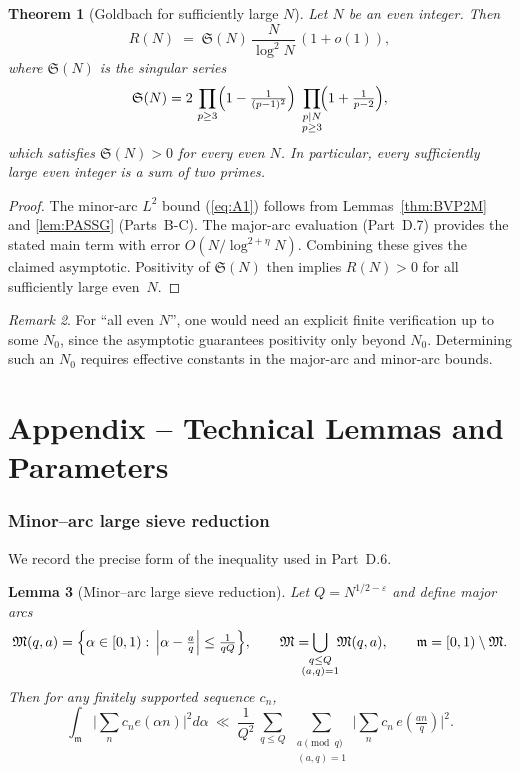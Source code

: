 \documentclass[11pt]{article}
\def\eqref#1{(\ref{#1})}%
\newtheorem{lemma}{Lemma}[part]
\newtheorem{theorem}[lemma]{Theorem}
\theoremstyle{definition}
\theoremstyle{remark}
\newtheorem{remark}[lemma]{Remark}
\numberwithin{equation}{part}
\begin{document}
\begin{theorem}[Goldbach for sufficiently large $N$]\label{thm:goldbach}
	Let $N$ be an even integer. Then
	\[
		R(N)\;=\;\mathfrak S(N)\,\frac{N}{\log^2 N}\,(1+o(1)),
	\]
	where $\mathfrak S(N)$ is the singular series
	\[
		\mathfrak S(N)
		=2\,\prod_{p\ge 3}\Bigl(1-\tfrac{1}{(p-1)^2}\Bigr)
		\;\prod_{\substack{p\mid N\\ p\ge 3}}\!\Bigl(1+\tfrac{1}{p-2}\Bigr),
	\]
	which satisfies $\mathfrak S(N)>0$ for every even $N$.
	In particular, every sufficiently large even integer is a sum of two primes.
\end{theorem}

\begin{proof}
	The minor-arc $L^2$ bound \eqref{eq:A1} follows from
	Lemmas~\ref{thm:BVP2M} and \ref{lem:PASSG} (Parts~B-C).
	The major-arc evaluation (Part~D.7) provides the stated main term with error $O(N/\log^{2+\eta}N)$.
	Combining these gives the claimed asymptotic.
	Positivity of $\mathfrak S(N)$ then implies $R(N)>0$ for all sufficiently large even~$N$.
\end{proof}

\begin{remark}
	For “all even $N$”, one would need an explicit finite verification up to some $N_0$, since the asymptotic guarantees positivity only beyond $N_0$. Determining such an $N_0$ requires effective constants in the major-arc and minor-arc bounds.
\end{remark}

\part{Appendix -- Technical Lemmas and Parameters}

\section{Minor--arc large sieve reduction}

We record the precise form of the inequality used in Part~D.6.

\begin{lemma}[Minor--arc large sieve reduction]\label{lem:largesieve-minor}
	Let $Q=N^{1/2-\varepsilon}$ and define major arcs
	\[
		\mathfrak M(q,a)=\Bigl\{\alpha\in[0,1):\,\Big|\alpha-\tfrac{a}{q}\Big|\le \tfrac{1}{qQ}\Bigr\},
		\qquad \mathfrak M=\!\!\!\!\!\bigcup_{\substack{q\le Q\\ (a,q)=1}}\!\!\mathfrak M(q,a),
		\qquad \mathfrak m=[0,1)\setminus\mathfrak M.
	\]
	Then for any finitely supported sequence $c_n$,
	\[
		\int_{\mathfrak m}\Big|\sum_{n}c_n e(\alpha n)\Big|^2 d\alpha
		\ \ll\ \frac{1}{Q^2}\,
		\sum_{q\le Q}\ \sum_{\substack{a\!\!\!\pmod q\\ (a,q)=1}}
		\Big|\sum_{n} c_n\,e\!\left(\tfrac{an}{q}\right)\Big|^2.
	\]
\end{lemma}
\end{document}

